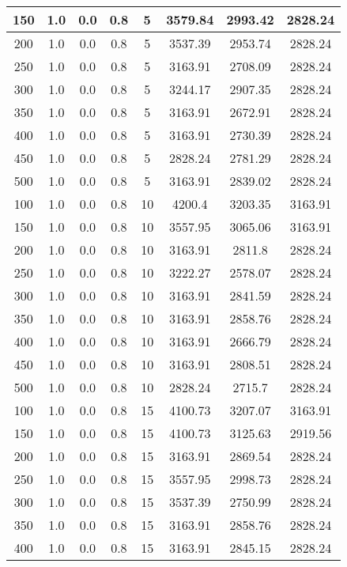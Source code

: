 \documentclass[a4paper, 12pt]{extreport}
\begin{document}
\begin{itemize}
\begin{longtable}{|c|c|c|c|c|c|c|c|}
			150 & 1.0 & 0.0 & 0.8 & 5 & 3579.84 & 2993.42 & 2828.24 \\\hline
			200 & 1.0 & 0.0 & 0.8 & 5 & 3537.39 & 2953.74 & 2828.24 \\\hline
			250 & 1.0 & 0.0 & 0.8 & 5 & 3163.91 & 2708.09 & 2828.24 \\\hline
			300 & 1.0 & 0.0 & 0.8 & 5 & 3244.17 & 2907.35 & 2828.24 \\\hline
			350 & 1.0 & 0.0 & 0.8 & 5 & 3163.91 & 2672.91 & 2828.24 \\\hline
			400 & 1.0 & 0.0 & 0.8 & 5 & 3163.91 & 2730.39 & 2828.24 \\\hline
			450 & 1.0 & 0.0 & 0.8 & 5 & 2828.24 & 2781.29 & 2828.24 \\\hline
			500 & 1.0 & 0.0 & 0.8 & 5 & 3163.91 & 2839.02 & 2828.24 \\\hline
			100 & 1.0 & 0.0 & 0.8 & 10 & 4200.4 & 3203.35 & 3163.91 \\\hline
			150 & 1.0 & 0.0 & 0.8 & 10 & 3557.95 & 3065.06 & 3163.91 \\\hline
			200 & 1.0 & 0.0 & 0.8 & 10 & 3163.91 & 2811.8 & 2828.24 \\\hline
			250 & 1.0 & 0.0 & 0.8 & 10 & 3222.27 & 2578.07 & 2828.24 \\\hline
			300 & 1.0 & 0.0 & 0.8 & 10 & 3163.91 & 2841.59 & 2828.24 \\\hline
			350 & 1.0 & 0.0 & 0.8 & 10 & 3163.91 & 2858.76 & 2828.24 \\\hline
			400 & 1.0 & 0.0 & 0.8 & 10 & 3163.91 & 2666.79 & 2828.24 \\\hline
			450 & 1.0 & 0.0 & 0.8 & 10 & 3163.91 & 2808.51 & 2828.24 \\\hline
			500 & 1.0 & 0.0 & 0.8 & 10 & 2828.24 & 2715.7 & 2828.24 \\\hline
			100 & 1.0 & 0.0 & 0.8 & 15 & 4100.73 & 3207.07 & 3163.91 \\\hline
			150 & 1.0 & 0.0 & 0.8 & 15 & 4100.73 & 3125.63 & 2919.56 \\\hline
			200 & 1.0 & 0.0 & 0.8 & 15 & 3163.91 & 2869.54 & 2828.24 \\\hline
			250 & 1.0 & 0.0 & 0.8 & 15 & 3557.95 & 2998.73 & 2828.24 \\\hline
			300 & 1.0 & 0.0 & 0.8 & 15 & 3537.39 & 2750.99 & 2828.24 \\\hline
			350 & 1.0 & 0.0 & 0.8 & 15 & 3163.91 & 2858.76 & 2828.24 \\\hline
			400 & 1.0 & 0.0 & 0.8 & 15 & 3163.91 & 2845.15 & 2828.24 \\\hline

\end{longtable}
\end{itemize}
\end{document}

